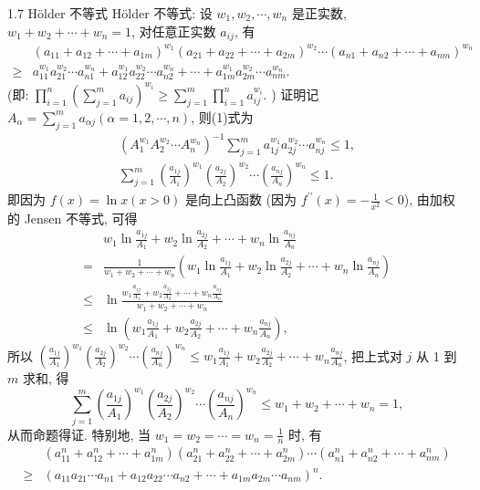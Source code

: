 1.7 Hölder 不等式
Hölder 不等式: 设 $w_1, w_2, \cdots, w_n$ 是正实数, $w_1+w_2+\cdots+w_n=1$, 对任意正实数 $a_{i j}$, 有
$$
\begin{aligned}
& \left(a_{11}+a_{12}+\cdots+a_{1 m}\right)^{w_1}\left(a_{21}+a_{22}+\cdots+a_{2 m}\right)^{w_2} \cdots\left(a_{n 1}+a_{n 2}+\cdots+a_{n m}\right)^{w_n} \\
\geqslant & a_{11}^{w_1} a_{21}^{w_2} \cdots a_{n 1}^{w_n}+a_{12}^{w_1} a_{22}^{w_2} \cdots a_{n 2}^{w_n}+\cdots+a_{1 m}^{w_1} a_{2 m}^{w_2} \cdots a_{n m}^{w_n} .
\end{aligned} \label{(1)}
$$
(即: $\prod_{i=1}^n\left(\sum_{j=1}^m a_{i j}\right)^{w_i} \geqslant \sum_{j=1}^m \prod_{i=1}^n a_{i j}^{w_i}$. )
证明记 $A_\alpha=\sum_{j=1}^m a_{\alpha j}(\alpha=1,2, \cdots, n)$, 则(1)式为
$$
\begin{gathered}
\left(A_1^{w_1} A_2^{w_2} \cdots A_n^{w_n}\right)^{-1} \sum_{j=1}^m a_{1 j}^{w_1} a_{2 j}^{w_2} \cdots a_{n j}^{w_n} \leqslant 1, \\
\sum_{j=1}^m\left(\frac{a_{1 j}}{A_1}\right)^{w_1}\left(\frac{a_{2 j}}{A_2}\right)^{w_2} \cdots\left(\frac{a_{n j}}{A_n}\right)^{w_n} \leqslant 1 .
\end{gathered}
$$
即因为 $f(x)=\ln x(x>0)$ 是向上凸函数 (因为 $f^{\prime \prime}(x)=-\frac{1}{x^2}<0$), 由加权的 Jensen 不等式, 可得
$$
\begin{aligned}
& w_1 \ln \frac{a_{1 j}}{A_1}+w_2 \ln \frac{a_{2 j}}{A_2}+\cdots+w_n \ln \frac{a_{n j}}{A_n} \\
= & \frac{1}{w_1+w_2+\cdots+w_n}\left(w_1 \ln \frac{a_{1 j}}{A_1}+w_2 \ln \frac{a_{2 j}}{A_2}+\cdots+w_n \ln \frac{a_{n j}}{A_n}\right) \\
\leqslant & \ln \frac{w_1 \frac{a_{1 j}}{A_1}+w_2 \frac{a_{2 j}}{A_2}+\cdots+w_n \frac{a_{n j}}{A_n}}{w_1+w_2+\cdots+w_n} \\
\leqslant & \ln \left(w_1 \frac{a_{1 j}}{A_1}+w_2 \frac{a_{2 j}}{A_2}+\cdots+w_n \frac{a_{n j}}{A_n}\right),
\end{aligned}
$$
所以 $\left(\frac{a_{1 j}}{A_1}\right)^{w_1}\left(\frac{a_{2 j}}{A_2}\right)^{w_2} \cdots\left(\frac{a_{n j}}{A_n}\right)^{w_n} \leqslant w_1 \frac{a_{1 j}}{A_1}+w_2 \frac{a_{2 j}}{A_2}+\cdots+w_n \frac{a_{n j}}{A_n}$,
把上式对 $j$ 从 1 到 $m$ 求和, 得
$$
\sum_{j=1}^m\left(\frac{a_{1 j}}{A_1}\right)^{w_1}\left(\frac{a_{2 j}}{A_2}\right)^{w_2} \cdots\left(\frac{a_{n j}}{A_n}\right)^{w_n} \leqslant w_1+w_2+\cdots+w_n=1,
$$
从而命题得证.
特别地, 当 $w_1=w_2=\cdots=w_n=\frac{1}{n}$ 时, 有
$$
\begin{aligned}
& \left(a_{11}^n+a_{12}^n+\cdots+a_{1 m}^n\right)\left(a_{21}^n+a_{22}^n+\cdots+a_{2 m}^n\right) \cdots\left(a_{n 1}^n+a_{n 2}^n+\cdots+a_{n m}^n\right) \\
\geqslant & \left(a_{11} a_{21} \cdots a_{n 1}+a_{12} a_{22} \cdots a_{n 2}+\cdots+a_{1 m} a_{2 m} \cdots a_{n m}\right)^n . \label{(2)}
\end{aligned}
$$
